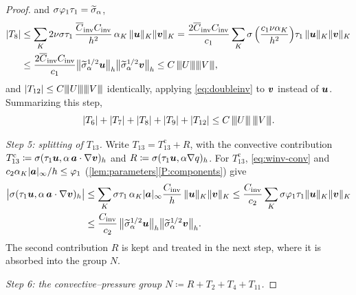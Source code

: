 \begin{proof}
and $\sigma\varphi_1\tau_1=\sigmatilde$,
\begin{align}
  |T_8|
  &\le \sum_{K} 2\nu\sigma\tau_1\,\frac{\Cinva\Cinv}{h^2}\,\alpha_K\,
  \norm{\bu}_K\norm{\bv}_K
  = \frac{2\Cinva\Cinv}{c_1}\sum_{K}
  \sigma\,\Bigl(\frac{c_1\nu\alpha_K}{h^2}\Bigr)\tau_1\,\norm{\bu}_K\norm{\bv}_K
  \nonumber\\
  &\le \frac{2\Cinva\Cinv}{c_1}
  \bigl\lVert\sigmatilde^{1/2}\bu\bigr\rVert_h
  \bigl\lVert\sigmatilde^{1/2}\bv\bigr\rVert_h
  \le C\,\triplenorm{U}\triplenorm{V},
  \label{eq:T8bound}
\end{align}
and $|T_{12}|\le C\triplenorm{U}\triplenorm{V}$ identically, applying
\eqref{eq:doubleinv} to $\bv$ instead of $\bu$. Summarizing this step,
\begin{equation}\label{eq:viscstep}
  |T_6|+|T_7|+|T_8|+|T_9|+|T_{12}| \le C\,\triplenorm{U}\,\triplenorm{V}.
\end{equation}

\medskip\noindent\emph{Step 5: splitting of $T_{13}$.}
Write $T_{13}=T_{13}^{\mathrm{c}}+R$, with the convective contribution
$T_{13}^{\mathrm{c}}\coloneqq\sigma(\tau_1\bu,\alpha\,\ba\cdot\nabla\bv)_h$ and
$R\coloneqq\sigma(\tau_1\bu,\alpha\nabla q)_h$. For $T_{13}^{\mathrm{c}}$,
\eqref{eq:winv-conv} and $c_2\alpha_K|\ba|_\infty/h\le\varphi_1$
(\cref{lem:parameters}\ref{P:components}) give
\begin{align}
  \bigl|\sigma(\tau_1\bu,\alpha\,\ba\cdot\nabla\bv)_h\bigr|
  &\le \sum_K \sigma\tau_1\,\alpha_K|\ba|_{\infty}\frac{\Cinv}{h}\,
  \norm{\bu}_K\norm{\bv}_K
  \le \frac{\Cinv}{c_2}\sum_K \sigma\varphi_1\tau_1\norm{\bu}_K\norm{\bv}_K
  \nonumber\\
  &\le \frac{\Cinv}{c_2}\,
  \bigl\lVert\sigmatilde^{1/2}\bu\bigr\rVert_h
  \bigl\lVert\sigmatilde^{1/2}\bv\bigr\rVert_h .
  \label{eq:T13conv}
\end{align}
The second contribution $R$ is kept and treated in the next step, where it is
absorbed into the group $N$.

\medskip\noindent\emph{Step 6: the convective--pressure group
$N\coloneqq R+T_2+T_4+T_{11}$.}


\end{proof}
